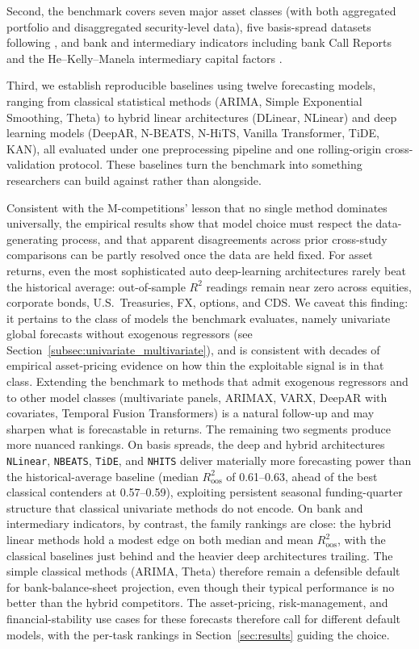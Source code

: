 \documentclass{article}
\begin{document}
Second, the benchmark covers seven major asset classes (with both aggregated portfolio and disaggregated security-level data), five basis-spread datasets following \citet{Siriwardane2021}, and bank and intermediary indicators including bank Call Reports \citep{Drechsler2017} and the He--Kelly--Manela intermediary capital factors \citep{He2017}.

Third, we establish reproducible baselines using twelve forecasting models, ranging from classical statistical methods (ARIMA, Simple Exponential Smoothing, Theta) to hybrid linear architectures (DLinear, NLinear) and deep learning models (DeepAR, N-BEATS, N-HiTS, Vanilla Transformer, TiDE, KAN), all evaluated under one preprocessing pipeline and one rolling-origin cross-validation protocol. These baselines turn the benchmark into something researchers can build against rather than alongside.

Consistent with the M-competitions' lesson that no single method dominates universally, the empirical results show that model choice must respect the data-generating process, and that apparent disagreements across prior cross-study comparisons can be partly resolved once the data are held fixed. For asset returns, even the most sophisticated auto deep-learning architectures rarely beat the historical average: out-of-sample $R^2$ readings remain near zero across equities, corporate bonds, U.S.~Treasuries, FX, options, and CDS. We caveat this finding: it pertains to the class of models the benchmark evaluates, namely univariate global forecasts without exogenous regressors (see Section~\ref{subsec:univariate_multivariate}), and is consistent with decades of empirical asset-pricing evidence on how thin the exploitable signal is in that class. Extending the benchmark to methods that admit exogenous regressors and to other model classes (multivariate panels, ARIMAX, VARX, DeepAR with covariates, Temporal Fusion Transformers) is a natural follow-up and may sharpen what is forecastable in returns. The remaining two segments produce more nuanced rankings. On basis spreads, the deep and hybrid architectures \texttt{NLinear}, \texttt{NBEATS}, \texttt{TiDE}, and \texttt{NHITS} deliver materially more forecasting power than the historical-average baseline (median $R^2_{\text{oos}}$ of 0.61--0.63, ahead of the best classical contenders at 0.57--0.59), exploiting persistent seasonal funding-quarter structure that classical univariate methods do not encode. On bank and intermediary indicators, by contrast, the family rankings are close: the hybrid linear methods hold a modest edge on both median and mean $R^2_{\text{oos}}$, with the classical baselines just behind and the heavier deep architectures trailing. The simple classical methods (ARIMA, Theta) therefore remain a defensible default for bank-balance-sheet projection, even though their typical performance is no better than the hybrid competitors. The asset-pricing, risk-management, and financial-stability use cases for these forecasts therefore call for different default models, with the per-task rankings in Section~\ref{sec:results} guiding the choice.
\end{document}
